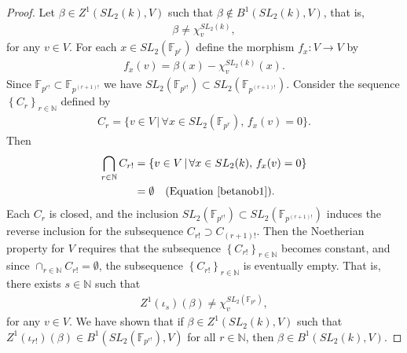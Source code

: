 \begin{proof}
Let $\beta\in Z^1(SL_2(k), V)$ such that $\beta \notin B^1(SL_2(k), V)$, that is,
\begin{align}\label{betanob1}
	\beta \neq \chi^{SL_2(k)}_v,
\end{align}
for any $v \in V$. For each $x\in SL_2(\mathbb{F}_{p^r})$ define the morphism $f_x:V\rightarrow V$ by
	\begin{align*}
		f_x(v) = \beta(x) - \chi^{SL_2(k)}_v(x).
	\end{align*}
Since $\mathbb{F}_{p^{r!}} \subset \mathbb{F}_{p^{(r+1)!}}$ we have $SL_2(\mathbb{F}_{p^{r!}}) \subset SL_2(\mathbb{F}_{p^{(r+1)!}})$.
Consider the sequence $\left\{C_{r}\right\}_{r \in \mathbb{N}}$ defined by
	\begin{align*}
		C_{r} = \{v \in V \,|\,\forall x\in SL_2(\mathbb{F}_{p^{r}}),\, f_x(v) = 0\}.
	\end{align*}
	Then
\begin{align*}
	\bigcap_{r\in \mathbb{N}}C_{r!} &= \{v \in V \,|\, \forall x \in SL_2(k),\, f_x(v) = 0\} \\
		&= \emptyset \quad(\textrm{Equation \ref{betanob1}}).
\end{align*}
	Each $C_{r}$ is closed, and the inclusion $SL_2(\mathbb{F}_{p^{r!}}) \subset SL_2(\mathbb{F}_{p^{(r+1)!}})$ induces the reverse inclusion for the subsequence $C_{r!} \supset C_{(r+1)!}$.
Then the Noetherian property for $V$ requires that the subsequence $\left\{C_{r!}\right\}_{r \in \mathbb{N}}$ becomes constant, and since $\cap_{r\in\mathbb{N}}C_{r!} = \emptyset$, the subsequence $\left\{C_{r!}\right\}_{r \in \mathbb{N}}$ is eventually empty.
That is, there exists $s\in\mathbb{N}$ such that
	\begin{align*}
		Z^1(\iota_s)(\beta) \neq \chi_v^{SL_2(\mathbb{F}_{p^{s}})},
	\end{align*}
	for any $v \in V$. We have shown that if $\beta \in Z^1(SL_2(k), V)$ such that $Z^1(\iota_{r!})(\beta) \in B^1(SL_2(\mathbb{F}_{p^{r!}}), V)$ for all $r \in \mathbb{N}$, then $\beta \in B^1(SL_2(k), V)$.


\end{proof}
